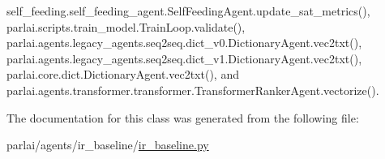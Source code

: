 self\+\_\+feeding.\+self\+\_\+feeding\+\_\+agent.\+Self\+Feeding\+Agent.\+update\+\_\+sat\+\_\+metrics(), parlai.\+scripts.\+train\+\_\+model.\+Train\+Loop.\+validate(), parlai.\+agents.\+legacy\+\_\+agents.\+seq2seq.\+dict\+\_\+v0.\+Dictionary\+Agent.\+vec2txt(), parlai.\+agents.\+legacy\+\_\+agents.\+seq2seq.\+dict\+\_\+v1.\+Dictionary\+Agent.\+vec2txt(), parlai.\+core.\+dict.\+Dictionary\+Agent.\+vec2txt(), and parlai.\+agents.\+transformer.\+transformer.\+Transformer\+Ranker\+Agent.\+vectorize().



The documentation for this class was generated from the following file\+:\begin{DoxyCompactItemize}
\item 
parlai/agents/ir\+\_\+baseline/\hyperlink{ir__baseline_8py}{ir\+\_\+baseline.\+py}\end{DoxyCompactItemize}

